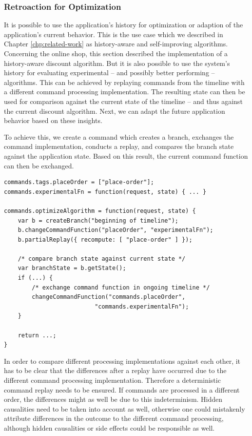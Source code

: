 \subsubsection{Retroaction for Optimization}
It is possible to use the application's history for optimization or adaption of
the application's current behavior. This is the use case which we described in 
Chapter \ref{chp:related-work} as history-aware and self-improving algorithms.
%
Concerning the online shop, this section described the implementation of a 
history-aware discount algorithm. But it is also possible to use the system's 
history for evaluating experimental -- and possibly better performing -- 
algorithms. This can be achieved by replaying commands from the timeline
with a different command processing implementation. The resulting state can 
then be used for comparison against the current state of the timeline -- and 
thus against the current discount algorithm. 
Next, we can adapt the future application behavior based on these insights.

To achieve this, we create a command which creates a branch, exchanges the 
\mbox{} command implementation, conducts a replay, and 
compares the branch state against the application state. Based on this result, 
the current command function can then be exchanged.

\begin{lstlisting}[style=styled]
commands.tags.placeOrder = ["place-order"];
commands.experimentalFn = function(request, state) { ... }

commands.optimizeAlgorithm = function(request, state) {
	var b = createBranch("beginning of timeline");
	b.changeCommandFunction("placeOrder", "experimentalFn");
	b.partialReplay({ recompute: [ "place-order" ] });

	/* compare branch state against current state */
	var branchState = b.getState();
	if (...) {
		/* exchange command function in ongoing timeline */
		changeCommandFunction("commands.placeOrder", 
                          "commands.experimentalFn");
	}

	return ...;
}
\end{lstlisting}

In order to compare different processing implementations against each other,
it has to be clear that the differences after a replay have occurred due to
the different command processing implementation. 
Therefore a deterministic command replay needs to be ensured. If commands are 
processed in a different order, the differences might as well be due to this 
indeterminism. Hidden causalities need to be taken into account as well, 
otherwise one could mistakenly attribute differences in the outcome to the 
different command processing, although hidden causalities or side effects 
could be responsible as well.

